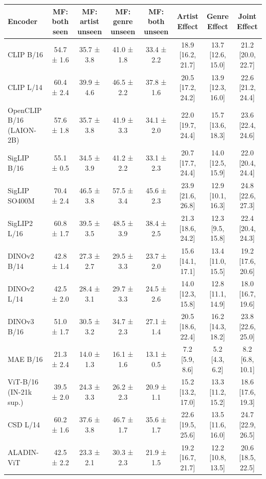 \begin{tabular}{lccccccc}
\toprule
Encoder & MF: both seen & MF: artist unseen & MF: genre unseen & MF: both unseen & Artist Effect & Genre Effect & Joint Effect \\
\midrule
CLIP B/16 & 54.7 ± 1.6 & 35.7 ± 3.8 & 41.0 ± 1.8 & 33.4 ± 2.2 & 18.9 [16.2, 21.7] & 13.7 [12.6, 15.0] & 21.2 [20.0, 22.7] \\
CLIP L/14 & 60.4 ± 2.4 & 39.9 ± 4.6 & 46.5 ± 2.2 & 37.8 ± 1.6 & 20.5 [17.2, 24.2] & 13.9 [12.3, 16.0] & 22.6 [21.2, 24.4] \\
OpenCLIP B/16 (LAION-2B) & 57.6 ± 1.8 & 35.7 ± 3.8 & 41.9 ± 3.3 & 34.1 ± 2.0 & 22.0 [19.7, 24.4] & 15.7 [13.6, 18.3] & 23.6 [22.4, 24.6] \\
SigLIP B/16 & 55.1 ± 0.5 & 34.5 ± 3.9 & 41.2 ± 2.2 & 33.1 ± 2.3 & 20.7 [17.7, 24.4] & 14.0 [12.5, 15.9] & 22.0 [20.4, 24.4] \\
SigLIP SO400M & 70.4 ± 2.4 & 46.5 ± 3.8 & 57.5 ± 3.4 & 45.6 ± 2.3 & 23.9 [21.6, 26.8] & 12.9 [10.1, 16.3] & 24.8 [22.6, 27.3] \\
SigLIP2 L/16 & 60.8 ± 1.7 & 39.5 ± 3.5 & 48.5 ± 3.9 & 38.4 ± 2.5 & 21.3 [18.6, 24.2] & 12.3 [9.5, 15.8] & 22.4 [20.4, 24.3] \\
DINOv2 B/14 & 42.8 ± 1.4 & 27.3 ± 2.7 & 29.5 ± 3.3 & 23.7 ± 2.0 & 15.6 [14.1, 17.1] & 13.4 [11.0, 15.5] & 19.2 [17.6, 20.6] \\
DINOv2 L/14 & 42.5 ± 2.0 & 28.4 ± 3.1 & 29.7 ± 3.3 & 24.5 ± 2.6 & 14.0 [12.3, 15.8] & 12.8 [11.1, 14.9] & 18.0 [16.7, 19.6] \\
DINOv3 B/16 & 51.0 ± 1.7 & 30.5 ± 3.2 & 34.7 ± 2.3 & 27.1 ± 1.4 & 20.5 [18.6, 22.4] & 16.2 [14.3, 18.2] & 23.8 [22.6, 25.0] \\
MAE B/16 & 21.3 ± 2.4 & 14.0 ± 1.3 & 16.1 ± 1.6 & 13.1 ± 0.5 & 7.2 [5.9, 8.6] & 5.2 [4.3, 6.2] & 8.2 [6.8, 10.1] \\
ViT-B/16 (IN-21k sup.) & 39.5 ± 2.0 & 24.3 ± 3.3 & 26.2 ± 2.3 & 20.9 ± 1.1 & 15.2 [13.2, 17.0] & 13.3 [11.2, 15.2] & 18.6 [17.6, 19.3] \\
CSD L/14 & 60.2 ± 1.6 & 37.6 ± 3.8 & 46.7 ± 1.7 & 35.6 ± 1.7 & 22.6 [19.5, 25.6] & 13.5 [11.6, 16.0] & 24.7 [22.9, 26.5] \\
ALADIN-ViT & 42.5 ± 2.2 & 23.3 ± 2.1 & 30.3 ± 2.3 & 21.9 ± 1.5 & 19.2 [16.7, 21.7] & 12.2 [10.8, 13.5] & 20.6 [18.5, 22.5] \\
\bottomrule
\end{tabular}
